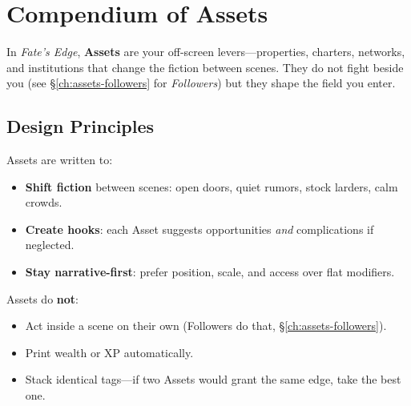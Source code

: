 \chapter{Compendium of Assets}
\label{ch:compendium-assets}

In \textit{Fate's Edge}, \textbf{Assets} are your off-screen levers—properties, charters, networks, and institutions that change the fiction between scenes. They do not fight beside you (see \S\ref{ch:assets-followers} for \emph{Followers}) but they shape the field you enter.

\section{Design Principles}
Assets are written to:
\begin{itemize}
  \item \textbf{Shift fiction} between scenes: open doors, quiet rumors, stock larders, calm crowds.
  \item \textbf{Create hooks}: each Asset suggests opportunities \emph{and} complications if neglected.
  \item \textbf{Stay narrative-first}: prefer position, scale, and access over flat modifiers.
\end{itemize}

Assets do \textbf{not}:
\begin{itemize}
  \item Act inside a scene on their own (Followers do that, \S\ref{ch:assets-followers}). 
  \item Print wealth or XP automatically.
  \item Stack identical tags—if two Assets would grant the same edge, take the best one. 
\end{itemize}

